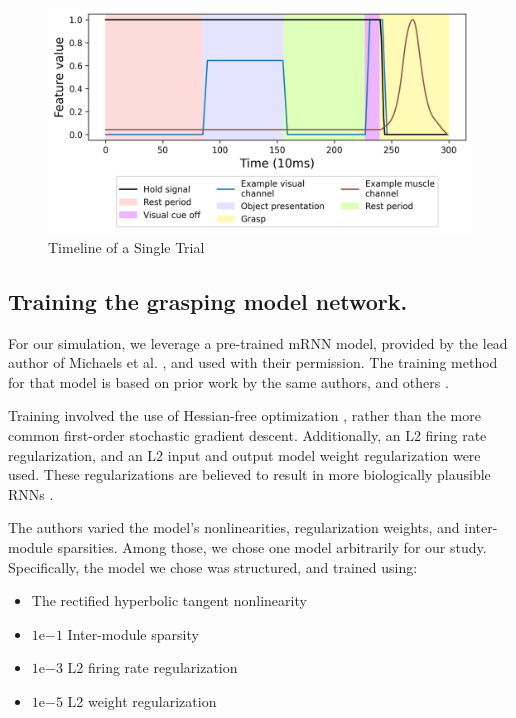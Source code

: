 \documentclass[12pt]{iopart}
\begin{document}
\begin{figure}[h!]
\centering
\includegraphics[scale=0.7]{trial_timeline.png}
\caption{Timeline of a Single Trial}
\label{fig:trial_timeline}
\end{figure}

\subsection{Training the grasping model network.}
\label{sup:michaelstraining}

For our simulation, we leverage a pre-trained mRNN model, provided by the
lead author of Michaels et al. \cite{michaels.mrnn}, and used with their permission.
The training method for that model is based on prior work by the same authors, and
others \cite{susillo.mrnn}.

Training involved the use of Hessian-free optimization \cite{martens.hessianfree},
rather than the more common first-order stochastic gradient descent. Additionally, an L2 firing
rate regularization, and an L2 input and output model weight regularization were used.
These regularizations are believed to result in more biologically plausible RNNs \cite{kao.sim}.

The authors varied the model's nonlinearities, regularization weights, and
inter-module sparsities. Among those, we chose one model arbitrarily for our study. Specifically,
the model we chose was structured, and trained using:

\begin{itemize}
    \item The rectified hyperbolic tangent nonlinearity
    \item $1\mathrm{e}{-1}$ Inter-module sparsity
    \item $1\mathrm{e}{-3}$ L2 firing rate regularization
    \item $1\mathrm{e}{-5}$ L2 weight regularization
\end{itemize}
\end{document}
